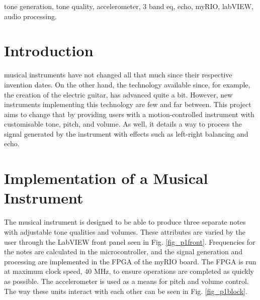 \begin{IEEEkeywords}
tone generation, tone quality, accelerometer, 3 band eq, echo, myRIO, labVIEW, audio processing. 
\end{IEEEkeywords}

\IEEEpeerreviewmaketitle



\section{Introduction}
%
%
%
%
 musical instruments have not changed all that much since their respective invention dates.
On the other hand, the technology available since, for example, the creation of the electric guitar, has advanced quite a bit.
However, new instruments implementing this technology are few and far between.
This project aims to change that by providing users with a motion-controlled instrument with customisable tone, pitch, and volume.
As well, it details a way to process the signal generated by the instrument with effects such as left-right balancing and echo.

\section{Implementation of a Musical Instrument}
The musical instrument is designed to be able to produce three separate notes with adjustable tone qualities and volumes.
 These attributes are varied by the user through the LabVIEW front panel seen in Fig. \ref{fig_p1front}.
 Frequencies for the notes are calculated in the microcontroller, and the signal generation and processing are implemented in the FPGA of the myRIO board.
 The FPGA is run at maximum clock speed, 40 MHz, to ensure operations are completed as quickly as possible.
 The accelerometer is used as a means for pitch and volume control.
 The way these units interact with each other can be seen in Fig. \ref{fig_p1block}.

